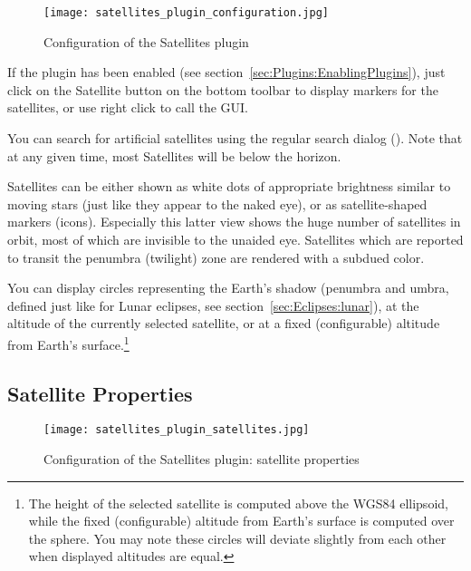 \begin{figure}[htbp]
	\centering\texttt{[image: satellites\_plugin\_configuration.jpg]}
	\caption{Configuration of the Satellites plugin}
	\label{fig:plugins:Satellites:Configuration}
\end{figure}

\noindent If the plugin has been enabled (see
section~\ref{sec:Plugins:EnablingPlugins}), just click on the
Satellite button   on the bottom
toolbar to display markers for the satellites, or use right click to call the GUI.

You can search for artificial satellites using
the regular search dialog (). Note that at any given time, most
Satellites will be below the horizon.

Satellites can be either shown as white dots of appropriate brightness
similar to moving stars (just like they appear to the naked eye), or
as satellite-shaped markers (icons). Especially this latter view shows
the huge number of satellites in orbit, most of which are invisible to
the unaided eye. 
Satellites which are reported to transit the penumbra (twilight) zone are rendered with a subdued color. 


You can display circles representing the Earth's
shadow (penumbra and umbra, defined just like for Lunar eclipses, see
section~\ref{sec:Eclipses:lunar}), at the altitude of the currently
selected satellite, or at a fixed (configurable) altitude from Earth's surface.\footnote{%
The height of the selected satellite is computed above the WGS84 ellipsoid, 
while the fixed (configurable) altitude from Earth's surface is computed over the sphere. 
You may note these circles will deviate slightly from each other when displayed altitudes are equal.}

\subsection{Satellite Properties}
\label{sec:plugins:Satellites:properties}

\begin{figure}[tbp]
	\centering\texttt{[image: satellites\_plugin\_satellites.jpg]}
	\caption{Configuration of the Satellites plugin: satellite properties}
	\label{fig:plugins:Satellites:Configuration:Satellites}
\end{figure}

